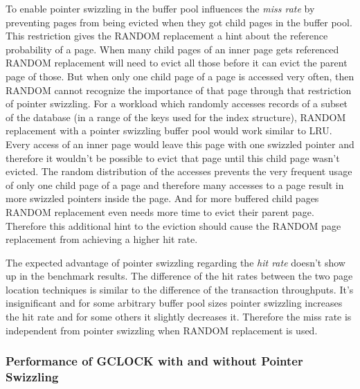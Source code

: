     To enable pointer swizzling in the buffer pool influences the \emph{miss rate} by preventing pages from being evicted when they got child pages in the buffer pool. This restriction gives the RANDOM replacement a hint about the reference probability of a page. When many child pages of an inner page gets referenced RANDOM replacement will need to evict all those before it can evict the parent page of those. But when only one child page of a page is accessed very often, then RANDOM cannot recognize the importance of that page through that restriction of pointer swizzling. For a workload which randomly accesses records of a subset of the database (in a range of the keys used for the index structure), RANDOM replacement with a pointer swizzling buffer pool would work similar to LRU. Every access of an inner page would leave this page with one swizzled pointer and therefore it wouldn't be possible to evict that page until this child page wasn't evicted. The random distribution of the accesses prevents the very frequent usage of only one child page of a page and therefore many accesses to a page result in more swizzled pointers inside the page. And for more buffered child pages RANDOM replacement even needs more time to evict their parent page. Therefore this additional hint to the eviction should cause the RANDOM page replacement from achieving a higher hit rate.

    The expected advantage of pointer swizzling regarding the \emph{hit rate} doesn't show up in the benchmark results. The difference of the hit rates between the two page location techniques is similar to the difference of the transaction throughputs. It's insignificant and for some arbitrary buffer pool sizes pointer swizzling increases the hit rate and for some others it slightly decreases it. Therefore the miss rate is independent from pointer swizzling when RANDOM replacement is used.

\subsubsection{Performance of GCLOCK with and without Pointer Swizzling}

